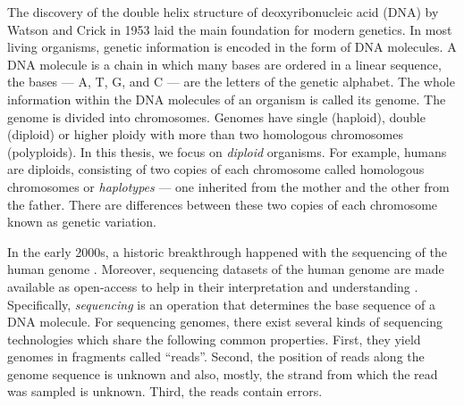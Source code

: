 The discovery of the double helix structure of deoxyribonucleic acid (DNA) by Watson and Crick in 1953 laid the main foundation for modern genetics.
In most living organisms, genetic information is encoded in the form of DNA molecules.
A DNA molecule is a chain in which many bases are ordered in a linear sequence, the bases --- A, T, G, and C --- are the letters of the genetic alphabet.
The whole information within the DNA molecules of an organism is called its genome. The genome is divided into chromosomes.
Genomes have single (haploid), double (diploid) or higher ploidy with more than two homologous chromosomes (polyploids). 
In this thesis, we focus on \textit{diploid} organisms. For example, humans are diploids, consisting of two copies of each chromosome called homologous chromosomes or \textit{haplotypes} --- one inherited from the mother and the other from the father.
There are differences between these two copies of each chromosome known as genetic variation. 

In the early 2000s, a historic breakthrough happened with the sequencing of the human genome \citep{venter2001sequence, collins2003human}.
Moreover, sequencing datasets of the human genome are made available as open-access to help in their interpretation and understanding \citep{church2005personal}.
Specifically, \textit{sequencing} is an operation that determines the base sequence of a DNA molecule.
For sequencing genomes, there exist several kinds of sequencing technologies which share the following common properties.
First, they yield genomes in fragments called ``reads''. Second, the position of reads along the genome sequence is unknown and also, mostly, the strand from which the read was sampled is unknown.
Third, the reads contain errors.

